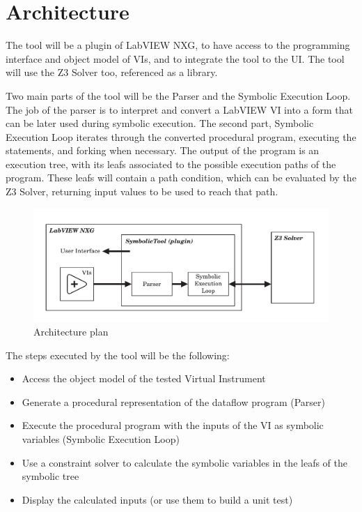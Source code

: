 \section{Architecture}

The tool will be a plugin of LabVIEW NXG, to have access to the programming interface and object model of VIs, and to integrate the tool to the UI. The tool will use the Z3 Solver too, referenced as a library.

Two main parts of the tool will be the Parser and the Symbolic Execution Loop. The job of the parser is to interpret and convert a LabVIEW VI into a form that can be later used during symbolic execution. The second part, Symbolic Execution Loop iterates through the converted procedural program, executing the statements, and forking when necessary. The output of the program is an execution tree, with its leafs associated to the possible execution paths of the program. These leafs will contain a path condition, which can be evaluated by the Z3 Solver, returning input values to be used to reach that path.
\begin{figure}
\includegraphics[width=150mm,keepaspectratio]{figures/architecture.pdf}
\caption{Architecture plan} 
\label{fig:architectureplan}
\end{figure}


The steps executed by the tool will be the following:

\begin{itemize}
  \item Access the object model of the tested Virtual Instrument
  \item Generate a procedural representation of the dataflow program (Parser)
  \item Execute the procedural program with the inputs of the VI as symbolic variables (Symbolic Execution Loop)
   \item Use a constraint solver to calculate the symbolic variables
in the leafs of the symbolic tree
     \item Display the calculated inputs (or use them to build a unit test)
  \end{itemize}


